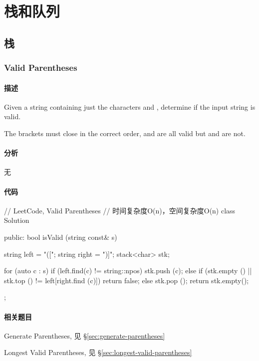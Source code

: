 \chapter{栈和队列}


\section{栈} %


\subsection{Valid Parentheses} %
\label{sec:valid-parentheses}


\subsubsection{描述}
Given a string containing just the characters \code{'(', ')', '\{', '\}', '['} and \code{']'}, determine if the input string is valid.

The brackets must close in the correct order,  and  are all valid but \code{"(]"} and  are not.


\subsubsection{分析}
无


\subsubsection{代码}
\begin{Code}
// LeetCode, Valid Parentheses
// 时间复杂度O(n)，空间复杂度O(n)
class Solution {
public:
    bool isValid (string const& s) {
        string left = "([{";
        string right = ")]}";
        stack<char> stk;

        for (auto c : s) {
            if (left.find(c) != string::npos) {
                stk.push (c);
            } else {
                if (stk.empty () || stk.top () != left[right.find (c)])
                    return false;
                else
                    stk.pop ();
            }
        }
        return stk.empty();
    }
};
\end{Code}


\subsubsection{相关题目}
\begindot
\item Generate Parentheses, 见 \S \ref{sec:generate-parentheses}
\item Longest Valid Parentheses, 见 \S \ref{sec:longest-valid-parentheses}
\myenddot


